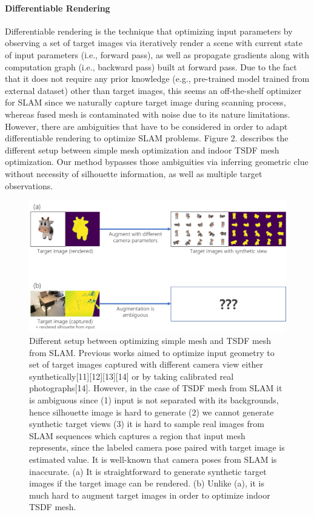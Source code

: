 \paragraph{Differentiable Rendering}
Differentiable rendering is the technique that 
optimizing input parameters by observing a set of target images 
via iteratively render a scene with current state of input parameters (i.e., forward pass), 
as well as propagate gradients along with computation graph (i.e., backward pass) built at forward pass. 
Due to the fact that it does not require any prior knowledge (e.g., pre-trained model trained from external dataset) 
other than target images, this seems an off-the-shelf optimizer for SLAM 
since we naturally capture target image during scanning process, 
whereas fused mesh is contaminated with noise due to its nature limitations. 
However, there are ambiguities that have to be considered 
in order to adapt differentiable rendering to optimize SLAM problems. 
Figure 2. describes the different setup between simple mesh optimization 
and indoor TSDF mesh optimization. 
Our method bypasses those ambiguities via inferring geometric clue 
without necessity of silhouette information, as well as multiple target observations.
\begin{figure}
\includegraphics[width=\columnwidth]{figures/2_prev_difference_simple_mesh_and_tsdf_mesh.png}
\caption{Different setup between optimizing simple mesh and TSDF mesh from SLAM. Previous works aimed to optimize input geometry to set of target images captured with different camera view either synthetically[11][12][13][14] or by taking calibrated real photographs[14]. However, in the case of TSDF mesh from SLAM it is ambiguous since (1) input is not separated with its backgrounds, hence silhouette image is hard to generate (2) we cannot generate synthetic target views (3) it is hard to sample real images from SLAM sequences which captures a region that input mesh represents, since the labeled camera pose paired with target image is estimated value. It is well-known that camera poses from SLAM is inaccurate. (a) It is straightforward to generate synthetic target images if the target image can be rendered. (b) Unlike (a), it is much hard to augment target images in order to optimize indoor TSDF mesh.}
\label{fig:two}
\end{figure}